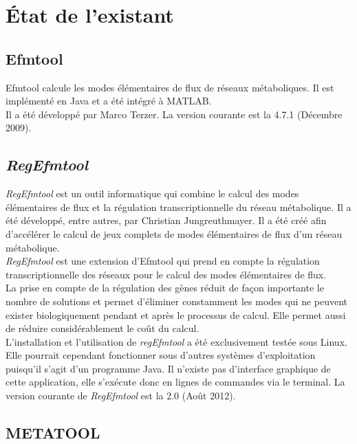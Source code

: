 \chapter{État de l'existant}

\section{Efmtool}

Efmtool calcule les modes élémentaires de flux de réseaux métaboliques. Il est implémenté en Java et a été intégré à MATLAB.\\
Il a été développé par Marco Terzer. La version courante est la 4.7.1 (Décembre 2009).

\section{\emph{RegEfmtool}}

\emph{RegEfmtool} est un outil informatique qui combine le calcul des modes élémentaires de flux et la régulation transcriptionnelle du réseau métabolique. Il a été développé, entre autres, par Christian Jungreuthmayer. Il a été créé afin d'accélérer le calcul de jeux complets de modes élémentaires de flux d'un réseau métabolique.\\
\emph{RegEfmtool} est une extension d'Efmtool qui prend en compte la régulation transcriptionnelle des réseaux pour le calcul des modes élémentaires de flux.\\
La prise en compte de la régulation des gènes réduit de façon importante le nombre de solutions et permet d'éliminer constamment les modes qui ne peuvent exister biologiquement pendant et après le processus de calcul. Elle permet aussi de réduire considérablement le coût du calcul.\\
L'installation et l'utilisation de \emph{regEfmtool} a été exclusivement testée sous Linux. Elle pourrait cependant fonctionner sous d'autres systèmes d'exploitation puisqu'il s'agit d'un programme Java. Il n'existe pas d'interface graphique de cette application, elle s'exécute donc en lignes de commandes via le terminal.
La version courante de \emph{RegEfmtool} est la 2.0 (Août 2012).

\section{METATOOL} 

